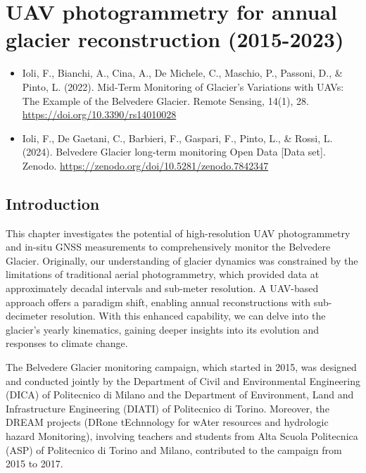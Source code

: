 \graphicspath{{figures/chapter3/}}
\onehalfspacing

\chapter{UAV photogrammetry for annual glacier reconstruction (2015-2023)}\label{ch:3}

\vfill


\begin{itemize}
    \item \noindent Ioli, F., Bianchi, A., Cina, A., De Michele, C., Maschio, P., Passoni, D., \& Pinto, L. (2022). Mid-Term Monitoring of Glacier's Variations with UAVs: The Example of the Belvedere Glacier. Remote Sensing, 14(1), 28. \url{https://doi.org/10.3390/rs14010028}
    \item Ioli, F., De Gaetani, C., Barbieri, F., Gaspari, F., Pinto, L., \& Rossi, L. (2024). Belvedere Glacier long-term monitoring Open Data [Data set]. Zenodo. \url{https://zenodo.org/doi/10.5281/zenodo.7842347}
\end{itemize}

\newpage

\section{Introduction}\label{sec:3:intro}

This chapter investigates the potential of high-resolution UAV photogrammetry and in-situ GNSS measurements to comprehensively monitor the Belvedere Glacier. 
Originally, our understanding of glacier dynamics was constrained by the limitations of traditional aerial photogrammetry, which provided data at approximately decadal intervals and sub-meter resolution. 
A UAV-based approach offers a paradigm shift, enabling annual reconstructions with sub-decimeter resolution.
With this enhanced capability, we can delve into the glacier's yearly kinematics, gaining deeper insights into its evolution and responses to climate change.

The Belvedere Glacier monitoring campaign, which started in 2015, was designed and conducted jointly by the Department of Civil and Environmental Engineering (DICA) of Politecnico di Milano and the Department of Environment, Land and Infrastructure Engineering (DIATI) of Politecnico di Torino. 
Moreover, the DREAM projects (DRone tEchnnology for wAter resources and hydrologic hazard Monitoring), involving teachers and students from Alta Scuola Politecnica (ASP) of Politecnico di Torino and Milano, contributed to the campaign from 2015 to 2017.

